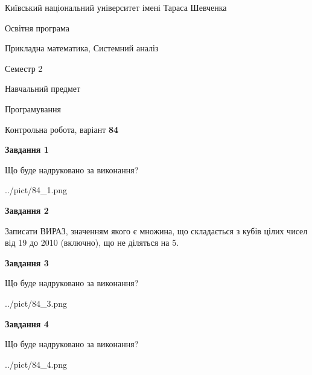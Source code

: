 \documentclass[12pt, ukrainian]{article}
\begin{document}
{{\begin {small}\par
{ \center  Київський національний університет імені Тараса Шевченка \par}
{\parbox {5 cm}{Освітня програма \hfill}{\parbox {8 cm}{Прикладна математика, Системний аналіз \hfill}}\parbox {5 cm}{\hfill Семестр 2}}\par
{\parbox {5 cm} {Навчальний предмет \hfill}\parbox {7 cm}{Програмування \hfill}\parbox {6cm}{\hfill}\par}\vspace{-7pt} \end{small}}{\center Контрольна робота, варіант  \No \textbf
{ 84 }\par}}
{
\begin {large}
{\begin {center}\textbf{Завдання 1}\end {center}}\par
Що буде надруковано за виконання?\par\par
\begin{center}
	{../pict/84_1.png}
\end{center}
\newpage

{\begin {center}\textbf{Завдання 2}\end {center}}\par
Записати ВИРАЗ, значенням якого є множина, що складається з кубів цілих чисел від 19 до 2010 (включно), що не діляться на 5.\par
\newpage

{\begin {center}\textbf{Завдання 3}\end {center}}\par
Що буде надруковано за виконання?
\begin{center}
	{../pict/84_3.png}
\end{center}
\newpage

{\begin {center}\textbf{Завдання 4}\end {center}}\par
Що буде надруковано за виконання?\par
\begin{center}
	{../pict/84_4.png}
\end{center}
\newpage


\end{large}}
\end{document}
